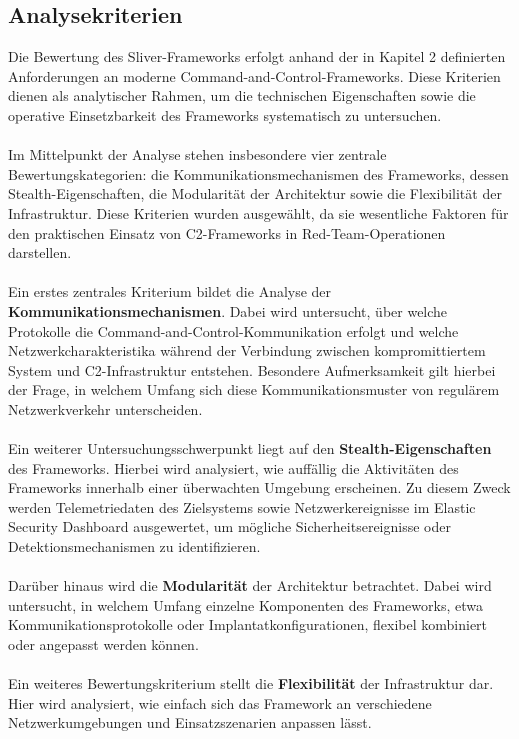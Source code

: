 \subsection{Analysekriterien}
Die Bewertung des Sliver-Frameworks erfolgt anhand der in Kapitel 2 definierten Anforderungen an moderne Command-and-Control-Frameworks. 
Diese Kriterien dienen als analytischer Rahmen, um die technischen Eigenschaften sowie die operative Einsetzbarkeit des Frameworks systematisch zu untersuchen.
\\\\
Im Mittelpunkt der Analyse stehen insbesondere vier zentrale Bewertungskategorien: die Kommunikationsmechanismen des Frameworks, dessen Stealth-Eigenschaften, die Modularität der Architektur sowie die Flexibilität der Infrastruktur. 
Diese Kriterien wurden ausgewählt, da sie wesentliche Faktoren für den praktischen Einsatz von C2-Frameworks in Red-Team-Operationen darstellen.
\\\\
Ein erstes zentrales Kriterium bildet die Analyse der \textbf{Kommunikationsmechanismen}. 
Dabei wird untersucht, über welche Protokolle die Command-and-Control-Kommunikation erfolgt und welche Netzwerkcharakteristika während der Verbindung zwischen kompromittiertem System und C2-Infrastruktur entstehen. 
Besondere Aufmerksamkeit gilt hierbei der Frage, in welchem Umfang sich diese Kommunikationsmuster von regulärem Netzwerkverkehr unterscheiden.
\\\\
Ein weiterer Untersuchungsschwerpunkt liegt auf den \textbf{Stealth-Eigenschaften} des Frameworks. 
Hierbei wird analysiert, wie auffällig die Aktivitäten des Frameworks innerhalb einer überwachten Umgebung erscheinen. 
Zu diesem Zweck werden Telemetriedaten des Zielsystems sowie Netzwerkereignisse im Elastic Security Dashboard ausgewertet, um mögliche Sicherheitsereignisse oder Detektionsmechanismen zu identifizieren.
\\\\
Darüber hinaus wird die \textbf{Modularität} der Architektur betrachtet. 
Dabei wird untersucht, in welchem Umfang einzelne Komponenten des Frameworks, etwa Kommunikationsprotokolle oder Implantatkonfigurationen, flexibel kombiniert oder angepasst werden können.
\\\\
Ein weiteres Bewertungskriterium stellt die \textbf{Flexibilität} der Infrastruktur dar. 
Hier wird analysiert, wie einfach sich das Framework an verschiedene Netzwerkumgebungen und Einsatzszenarien anpassen lässt. 
